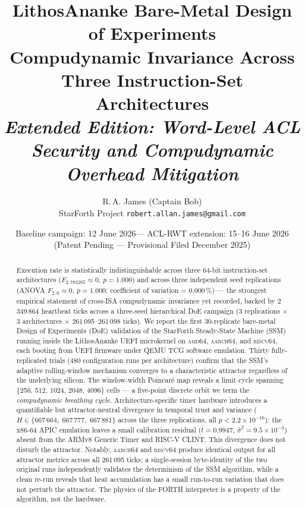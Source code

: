 \documentclass[10pt,a4paper]{article}
\title{%
  \textbf{LithosAnanke Bare-Metal Design of Experiments}\\[0.4em]
  \large Compudynamic Invariance Across Three Instruction-Set Architectures\\[0.3em]
  \normalsize\textit{Extended Edition: Word-Level ACL Security and Compudynamic Overhead Mitigation}
}
\author{%
  R.\,A. James (Captain Bob)\\[0.2em]
  \small StarForth Project \quad\texttt{robert.allan.james@gmail.com}
}
\date{%
  Baseline campaign: 12 June 2026\quad---\quad
  ACL-RWT extension: 15--16 June 2026\\[0.2em]
  \textnormal{(Patent Pending --- Provisional Filed December 2025)}
}
\begin{document}
\maketitle
\thispagestyle{empty}

\begin{abstract}
\noindent
Execution rate is statistically indistinguishable across three 64-bit
instruction-set architectures (\(F_{2,783285}\approx 0\), \(p=1.000\)) and
across three independent seed replications (ANOVA \(F_{2,6}\approx 0\),
\(p=1.000\); coefficient of variation = 0.000\,\%) ---
the strongest empirical statement of cross-ISA compudynamic invariance yet
recorded, backed by 2\,349\,864 heartbeat ticks across a three-seed hierarchical
DoE campaign (3 replications \(\times\) 3 architectures \(\times\) 261\,095--261\,098 ticks).
We report the first 30-replicate bare-metal Design of Experiments (DoE)
validation of the StarForth Steady-State Machine (SSM) running inside the
LithosAnanke UEFI microkernel on \textsc{amd64}, \textsc{aarch64}, and
\textsc{riscv64}, each booting from UEFI firmware under QEMU TCG software
emulation.
Thirty fully-replicated trials (480 configuration runs per architecture)
confirm that the SSM's adaptive rolling-window mechanism converges to a
characteristic attractor regardless of the underlying silicon.  The
window-width Poincaré map reveals a limit cycle spanning \{256, 512, 1024,
2048, 4096\} cells --- a five-point discrete orbit we term the
\emph{compudynamic breathing cycle}.
Architecture-specific timer hardware introduces a quantifiable but
attractor-neutral divergence in temporal trust and variance
(\(H \in \{667\,664,\; 667\,777,\; 667\,881\}\) across the three replications,
all \(p < 2.2 \times 10^{-16}\)): the x86-64 APIC emulation
leaves a small calibration residual ($\bar{t}=0.9947$,
$\bar{\sigma}^2=9.5\times10^{-3}$) absent from the ARMv8 Generic Timer and
RISC-V CLINT.  This divergence does not disturb the attractor.
Notably, \textsc{aarch64} and \textsc{riscv64} produce identical output for
all attractor metrics across all 261\,095 ticks; a single-session byte-identity
of the two original runs independently validates the determinism of the SSM
algorithm, while a clean re-run reveals that heat accumulation has a small
run-to-run variation that does not perturb the attractor.
The physics of the FORTH interpreter is a property of the algorithm, not
the hardware.


\end{abstract}
\end{document}

